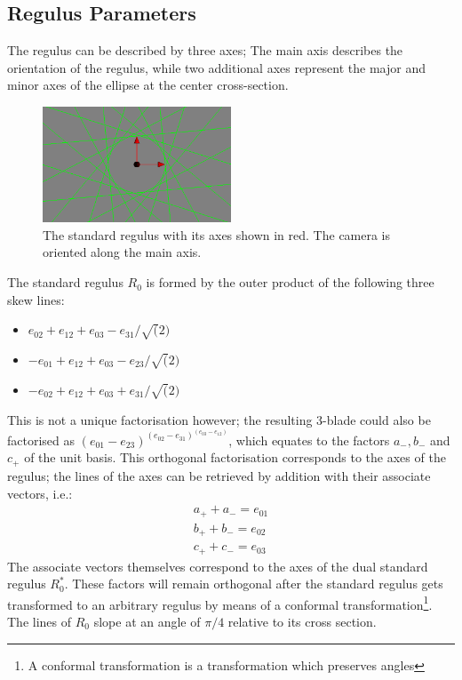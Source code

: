 \documentclass[a4paper, 10pt]{article}
\begin{document}
\subsection{Regulus Parameters}
The regulus can be described by three axes; The main axis describes the
orientation of the regulus, while two additional axes represent the major and
minor axes of the ellipse at the center cross-section.

\begin{figure}[htbp]
  \centering
  \includegraphics[width=0.5\textwidth]{axes.png}
  \caption{The standard regulus with its axes shown in red. The camera is
    oriented along the main axis.}
  \label{fig:axes}
\end{figure}

The standard regulus $R_0$ is formed by the outer product of the following three
skew lines:
\begin{itemize}
  \item $e_{02} + e_{12} + e_{03} - e_{31} / \sqrt(2)$
  \item $-e_{01} + e_{12} + e_{03} - e_{23} / \sqrt(2)$
  \item $-e_{02} + e_{12} + e_{03} + e_{31} / \sqrt(2)$
\end{itemize}

This is not a unique factorisation however; the resulting 3-blade could also be
factorised as $(e_{01} - e_{23}) ^ (e_{02} - e_{31}) ^ (e_{03} - e_{12})$, which
equates to the factors $a_-, b_-$ and $c_+$ of the unit basis. This
orthogonal factorisation corresponds to the axes of the regulus; the lines of
the axes can be retrieved by addition with their associate vectors, i.e.:
\begin{align*}
  a_+ + a_- = e_{01} \\
  b_+ + b_- = e_{02} \\
  c_+ + c_- = e_{03}
\end{align*}
The associate vectors themselves correspond to the axes of the dual standard
regulus $R_{0}^*$. These factors will remain orthogonal after the standard
regulus gets transformed to an arbitrary regulus by means of a conformal
transformation\footnote{A conformal transformation is a transformation which
  preserves angles}.
The lines of $R_{0}$ slope at an angle of $\pi / 4$ relative to its cross
section.
\end{document}
